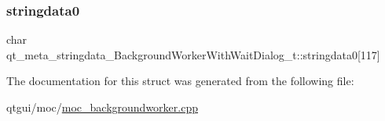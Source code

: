 \subsubsection{\texorpdfstring{stringdata0}{stringdata0}}
{\footnotesize\ttfamily char qt\+\_\+meta\+\_\+stringdata\+\_\+\+Background\+Worker\+With\+Wait\+Dialog\+\_\+t\+::stringdata0\mbox{[}117\mbox{]}}



The documentation for this struct was generated from the following file\+:\begin{DoxyCompactItemize}
\item 
qtgui/moc/\mbox{\hyperlink{moc__backgroundworker_8cpp}{moc\+\_\+backgroundworker.\+cpp}}\end{DoxyCompactItemize}
